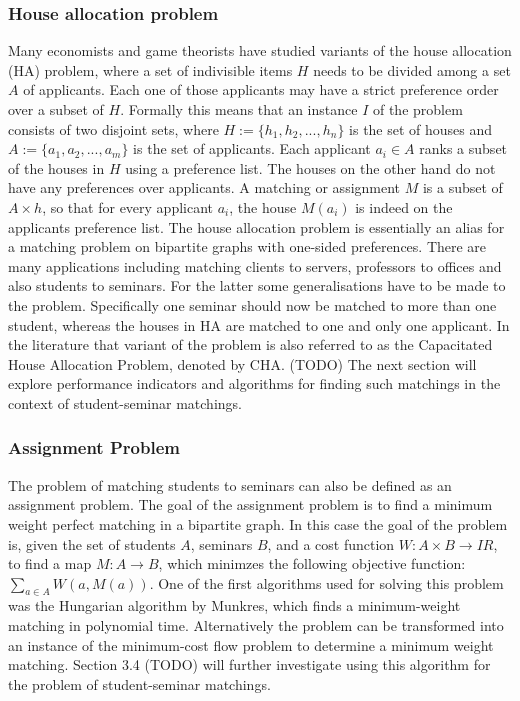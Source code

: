 \subsubsection{House allocation problem}
Many economists and game theorists\cite{FEKETE2003219} have studied variants of the house allocation (HA) problem, where a set of indivisible items $H$ needs to be divided among a set $A$ of applicants. Each one of those applicants may have a strict preference order over a subset of $H$. Formally this means that an instance $I$ of the problem consists of two disjoint sets, where $H := \{h_1, h_2, ..., h_n\}$ is the set of houses and $A := \{a_1, a_2, ..., a_m\}$ is the set of applicants. Each applicant $a_i \in A$ ranks a subset of the houses in $H$ using a preference list. The houses on the other hand do not have any preferences over applicants. A matching or assignment $M$ is a subset of $A \times h$, so that for every applicant $a_i$, the house $M(a_i)$ is indeed on the applicants preference list.\cite{SngThesis} 
\newline
The house allocation problem is essentially an alias for a matching problem on bipartite graphs with one-sided preferences. There are many applications including matching clients to servers, professors to offices and also students to seminars. For the latter some generalisations have to be made to the problem. Specifically one seminar should now be matched to more than one student, whereas the houses in HA are matched to one and only one applicant. In the literature that variant of the problem is also referred to as the Capacitated House Allocation Problem, denoted by CHA.\cite{algorithmics} (TODO) The next section will explore performance indicators and algorithms for finding such matchings in the context of student-seminar matchings.

\subsubsection{Assignment Problem}
The problem of matching students to seminars can also be defined as an assignment problem. The goal of the assignment problem is to find a minimum weight perfect matching in a bipartite graph. In this case the goal of the problem is, given the set of students $A$, seminars $B$, and a cost function $W: A \times B \rightarrow I\!R$, to find a map $M: A \rightarrow B$, which minimzes the following objective function:
$\sum_{a \in A} W(a, M(a))$.
\newline
One of the first algorithms used for solving this problem was the Hungarian algorithm by Munkres, which finds a minimum-weight matching in polynomial time.\cite{Munkres} 
\newline
Alternatively the problem can be transformed into an instance of the minimum-cost flow problem to determine a minimum weight matching. Section 3.4 (TODO) will further investigate using this algorithm for the problem of student-seminar matchings.


